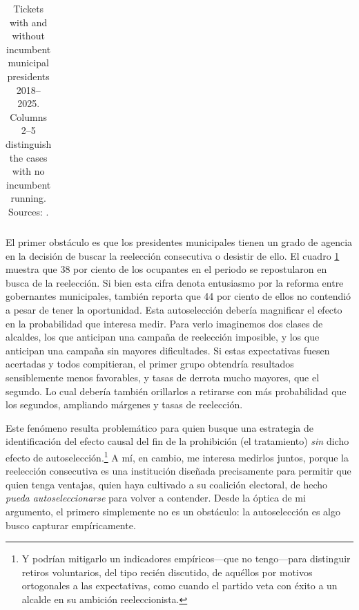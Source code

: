 \documentclass[letter,12pt]{article}
\begin{document}
\begin{table}
\begin{tabular}{crrrrrrr}
    \\ [-2ex] \hline
  \end{tabular}
  \caption{Tickets with and without incumbent municipal presidents 2018--2025. Columns 2--5 distinguish the cases with no incumbent running. Sources: \citet{magar.el.dataset.2026}.}\label{T:incballot}
\end{table}

\noindent El primer obstáculo es que los presidentes municipales tienen un grado de agencia en la decisión de buscar la reelección consecutiva o desistir de ello. El cuadro \ref{T:incballot} muestra que 38 por ciento de los ocupantes en el periodo se repostularon en busca de la reelección. Si bien esta cifra denota entusiasmo por la reforma entre gobernantes municipales, también reporta que 44 por ciento de ellos no contendió a pesar de tener la oportunidad. Esta autoselección debería magnificar el efecto en la probabilidad que interesa medir. Para verlo imaginemos dos clases de alcaldes, los que anticipan una campaña de reelección imposible, y los que anticipan una campaña sin mayores dificultades. Si estas expectativas fuesen acertadas y todos compitieran, el primer grupo obtendría resultados sensiblemente menos favorables, y tasas de derrota mucho mayores, que el segundo. Lo cual debería también orillarlos a retirarse con más probabilidad que los segundos, ampliando márgenes y tasas de reelección.

Este fenómeno resulta problemático para quien busque una estrategia de identificación del efecto causal del fin de la prohibición (el tratamiento) \emph{sin} dicho efecto de autoselección.\footnote{Y podrían mitigarlo un indicadores empíricos---que no tengo---para distinguir retiros voluntarios, del tipo recién discutido, de aquéllos por motivos ortogonales a las expectativas, como cuando el partido veta con éxito a un alcalde en su ambición reeleccionista.} A mí, en cambio, me interesa medirlos juntos, porque la reelección consecutiva es una institución diseñada precisamente para permitir que quien tenga ventajas, quien haya cultivado a su coalición electoral, de hecho \emph{pueda autoseleccionarse} para volver a contender. Desde la óptica de mi argumento, el primero simplemente no es un obstáculo: la autoselección es algo busco capturar empíricamente.
\end{document}
